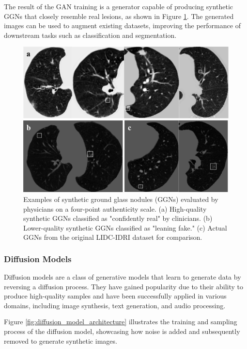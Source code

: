 \documentclass{article}
\begin{document}
The result of the GAN training is a generator capable of producing synthetic GGNs that closely resemble real lesions, as shown in Figure \ref{fig:gan_results}. The generated images can be used to augment existing datasets, improving the performance of downstream tasks such as classification and segmentation.

\begin{figure}[htb]
    \centering
    \includegraphics[width=0.98\linewidth]{images/gan_result.pdf}
    \caption{Examples of synthetic ground glass nodules (GGNs) evaluated by physicians on a four-point authenticity scale. (a) High-quality synthetic GGNs classified as "confidently real" by clinicians. (b) Lower-quality synthetic GGNs classified as "leaning fake." (c) Actual GGNs from the original LIDC-IDRI dataset for comparison.}
    \label{fig:gan_results}
\end{figure}

\subsubsection{Diffusion Models}
Diffusion models are a class of generative models that learn to generate data by reversing a diffusion process. They have gained popularity due to their ability to produce high-quality samples and have been successfully applied in various domains, including image synthesis, text generation, and audio processing\cite{songScoreBasedGenerativeModeling2021}.

Figure \ref{fig:diffusion_model_architecture} illustrates the training and sampling process of the diffusion model, showcasing how noise is added and subsequently removed to generate synthetic images.
\end{document}
